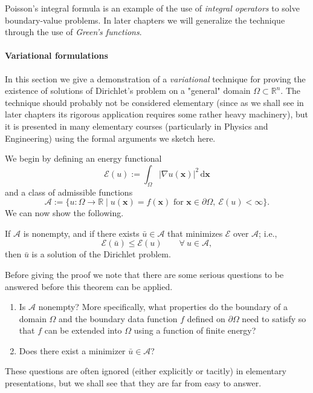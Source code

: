 Poisson's integral formula is an example of the use of \emph{integral operators} to solve boundary-value problems. In later chapters we will generalize the technique through the use of \emph{Green's functions}.

\paragraph*{Variational formulations}

In this section we give a demonstration of a \emph{variational} technique for proving the existence of solutions of Dirichlet's problem on a "general" domain $\Omega\subset\mathbb{R}^n$. The technique should probably not be considered elementary (since as we shall see in later chapters its rigorous application requires some rather heavy machinery), but it is presented in many elementary courses (particularly in Physics and Engineering) using the formal arguments we sketch here.

We begin by defining an energy functional
\begin{equation}\label{eq:dirichlet-energy}
\mathcal{E}(u):=\int_\Omega|\nabla u(\bm{x})|^2\,\mathrm{d}\bm{x}
\end{equation}
and a class of admissible functions
\begin{equation}\label{eq:dirichlet-admissible-class}
\mathcal{A}:=\{u:\Omega\to\mathbb{R}\mid u(\bm{x})=f(\bm{x})\text{ for }\bm{x}\in\partial\Omega,\ \mathcal{E}(u)<\infty\}.
\end{equation}
We can now show the following.

\begin{Theorem}
\label{thm:dirichlet-energy-minimizer}
If $\mathcal{A}$ is nonempty, and if there exists $\bar u\in\mathcal{A}$ that minimizes $\mathcal{E}$ over $\mathcal{A}$; i.e.,
\begin{equation}\label{eq:dirichlet-energy-minimizer}
\mathcal{E}(\bar u)\leq\mathcal{E}(u)\qquad\forall\ u\in\mathcal{A},
\end{equation}
then $\bar u$ is a solution of the Dirichlet problem.
\end{Theorem}

Before giving the proof we note that there are some serious questions to be answered before this theorem can be applied.
\begin{enumerate}
\item Is $\mathcal{A}$ nonempty? More specifically, what properties do the boundary of a domain $\Omega$ and the boundary data function $f$ defined on $\partial\Omega$ need to satisfy so that $f$ can be extended into $\Omega$ using a function of finite energy?
\item Does there exist a minimizer $\bar u\in\mathcal{A}$?
\end{enumerate}
These questions are often ignored (either explicitly or tacitly) in elementary presentations, but we shall see that they are far from easy to answer.

